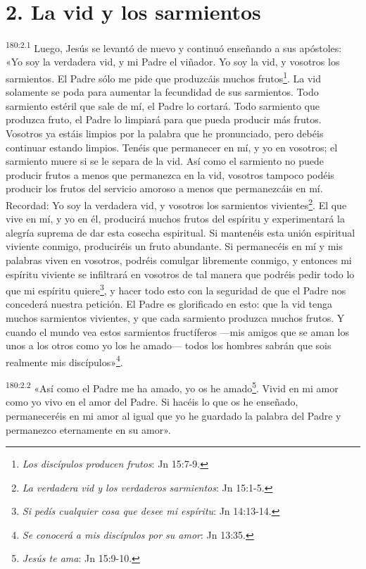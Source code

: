 \section*{2. La vid y los sarmientos}
\par
\textsuperscript{180:2.1} Luego, Jesús se levantó de nuevo y continuó enseñando a sus apóstoles: «Yo soy la verdadera vid, y mi Padre el viñador. Yo soy la vid, y vosotros los sarmientos. El Padre sólo me pide que produzcáis muchos frutos\footnote{\textit{Los discípulos producen frutos}: Jn 15:7-9.}. La vid solamente se poda para aumentar la fecundidad de sus sarmientos. Todo sarmiento estéril que sale de mí, el Padre lo cortará. Todo sarmiento que produzca fruto, el Padre lo limpiará para que pueda producir más frutos. Vosotros ya estáis limpios por la palabra que he pronunciado, pero debéis continuar estando limpios. Tenéis que permanecer en mí, y yo en vosotros; el sarmiento muere si se le separa de la vid. Así como el sarmiento no puede producir frutos a menos que permanezca en la vid, vosotros tampoco podéis producir los frutos del servicio amoroso a menos que permanezcáis en mí. Recordad: Yo soy la verdadera vid, y vosotros los sarmientos vivientes\footnote{\textit{La verdadera vid y los verdaderos sarmientos}: Jn 15:1-5.}. El que vive en mí, y yo en él, producirá muchos frutos del espíritu y experimentará la alegría suprema de dar esta cosecha espiritual. Si mantenéis esta unión espiritual viviente conmigo, produciréis un fruto abundante. Si permanecéis en mí y mis palabras viven en vosotros, podréis comulgar libremente conmigo, y entonces mi espíritu viviente se infiltrará en vosotros de tal manera que podréis pedir todo lo que mi espíritu quiere\footnote{\textit{Si pedís cualquier cosa que desee mi espíritu}: Jn 14:13-14.}, y hacer todo esto con la seguridad de que el Padre nos concederá nuestra petición. El Padre es glorificado en esto: que la vid tenga muchos sarmientos vivientes, y que cada sarmiento produzca muchos frutos. Y cuando el mundo vea estos sarmientos fructíferos ---mis amigos que se aman los unos a los otros como yo los he amado--- todos los hombres sabrán que sois realmente mis discípulos»\footnote{\textit{Se conocerá a mis discípulos por su amor}: Jn 13:35.}.

\par
\textsuperscript{180:2.2} «Así como el Padre me ha amado, yo os he amado\footnote{\textit{Jesús te ama}: Jn 15:9-10.}. Vivid en mi amor como yo vivo en el amor del Padre. Si hacéis lo que os he enseñado, permaneceréis en mi amor al igual que yo he guardado la palabra del Padre y permanezco eternamente en su amor».


